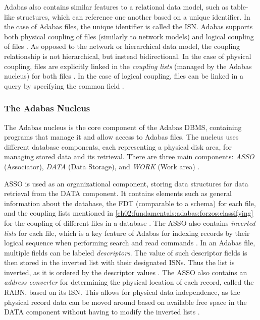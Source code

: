 Adabas also contains similar features to a relational data model, such as table-like structures, which can reference one another based on a unique identifier. In the case of Adabas files, the unique identifier is called the \ac{ISN}. Adabas supports both physical coupling of files (similarly to network models) and logical coupling of files \cite{adabasconcepts}. As opposed to the network or hierarchical data model, the coupling relationship is not hierarchical, but instead bidirectional. In the case of physical coupling, files are explicitly linked in the \textit{coupling lists} (managed by the Adabas nucleus) for both files \cite{adabashybrid}. In the case of logical coupling, files can be linked in a query by specifying the common field \cite{adabasconcepts}. %

\subsubsection{The Adabas Nucleus}
The Adabas nucleus is the core component of the Adabas \ac{DBMS}, containing programs that manage it and allow access to Adabas files. The nucleus uses different database components, each representing a physical disk area, for managing stored data and its retrieval. There are three main components: \textit{ASSO} (Associator), \textit{DATA} (Data Storage), and \textit{WORK} (Work area) \cite{adabasconcepts}.

ASSO is used as an organizational component, storing data structures for data retrieval from the DATA component. It contains elements such as general information about the database, the \ac{FDT} (comparable to a schema) for each file, and the coupling lists mentioned in \ref{ch02:fundamentals:adabas:forzos:classifying} for the coupling of different files in a database \cite{adabasconcepts}. The ASSO also contains \textit{inverted lists} for each file, which is a key feature of Adabas for indexing records by their logical sequence when performing search and read commands \cite{adabashybrid}. In an Adabas file, multiple fields can be labeled \textit{descriptors}. The value of such descriptor fields is then stored in the inverted list with their designated \ac{ISN}s. Thus the list is inverted, as it is ordered by the descriptor values \cite{adabasconcepts}. The ASSO also contains an \textit{address converter} for determining the physical location of each record, called the \ac{RABN}, based on its \ac{ISN}. This allows for physical data independence, as the physical record data can be moved around based on available free space in the DATA component without having to modify the inverted lists \cite{adabashybrid}. 

